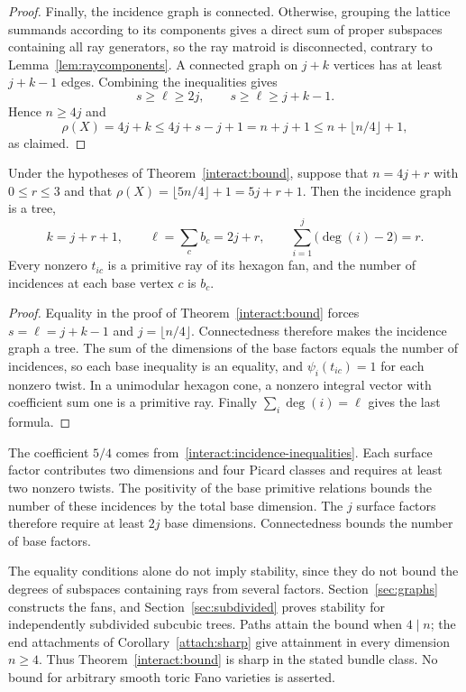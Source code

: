 \begin{proof}
Finally, the incidence graph is connected. Otherwise, grouping the
lattice summands according to its components gives a direct sum of
proper subspaces containing all ray generators, so the ray matroid is
disconnected, contrary to Lemma~\ref{lem:raycomponents}. A connected graph on $j+k$
vertices has at least $j+k-1$ edges. Combining the inequalities gives
\[
 s\ge\ell\ge2j,\qquad s\ge\ell\ge j+k-1.
\]
Hence $n\ge4j$ and
\[
 \rho(X)=4j+k\le 4j+s-j+1=n+j+1
 \le n+\lfloor n/4\rfloor+1,
\]
as claimed.
\end{proof}

\begin{corollary}\label{interact:equality}
Under the hypotheses of Theorem~\ref{interact:bound}, suppose that
$n=4j+r$ with $0\le r\le3$ and that
$\rho(X)=\lfloor5n/4\rfloor+1=5j+r+1$. Then the incidence graph is a tree,
\[
 k=j+r+1,\qquad \ell=\sum_cb_c=2j+r,\qquad
 \sum_{i=1}^j\bigl(\deg(i)-2\bigr)=r.
\]
Every nonzero $t_{ic}$ is a primitive ray of its hexagon fan, and the
number of incidences at each base vertex $c$ is $b_c$.
\end{corollary}
\begin{proof}
Equality in the proof of Theorem~\ref{interact:bound} forces
$s=\ell=j+k-1$ and $j=\lfloor n/4\rfloor$. Connectedness therefore makes
the incidence graph a tree. The sum of the dimensions of the base factors
equals the number of incidences, so each base inequality is an equality, and
$\psi_i(t_{ic})=1$ for each nonzero twist. In a unimodular hexagon cone,
a nonzero integral vector with coefficient sum one is a primitive ray.
Finally $\sum_i\deg(i)=\ell$ gives the last formula.
\end{proof}

The coefficient $5/4$ comes from~\eqref{interact:incidence-inequalities}.
Each surface factor contributes two dimensions and four Picard classes
and requires at least two nonzero twists. The positivity of the base
primitive relations bounds the number of these incidences by the total
base dimension. The $j$ surface factors therefore require
at least $2j$ base dimensions. Connectedness bounds the number of
base factors.

The equality conditions alone do not imply stability, since they do not
bound the degrees of subspaces containing rays from several factors.
Section~\ref{sec:graphs} constructs the fans, and
Section~\ref{sec:subdivided} proves stability for independently
subdivided subcubic trees. Paths attain the bound when $4\mid n$;
the end attachments of Corollary~\ref{attach:sharp} give attainment in
every dimension $n\ge4$. Thus Theorem~\ref{interact:bound} is sharp
in the stated bundle class. No bound for arbitrary smooth toric Fano
varieties is asserted.

